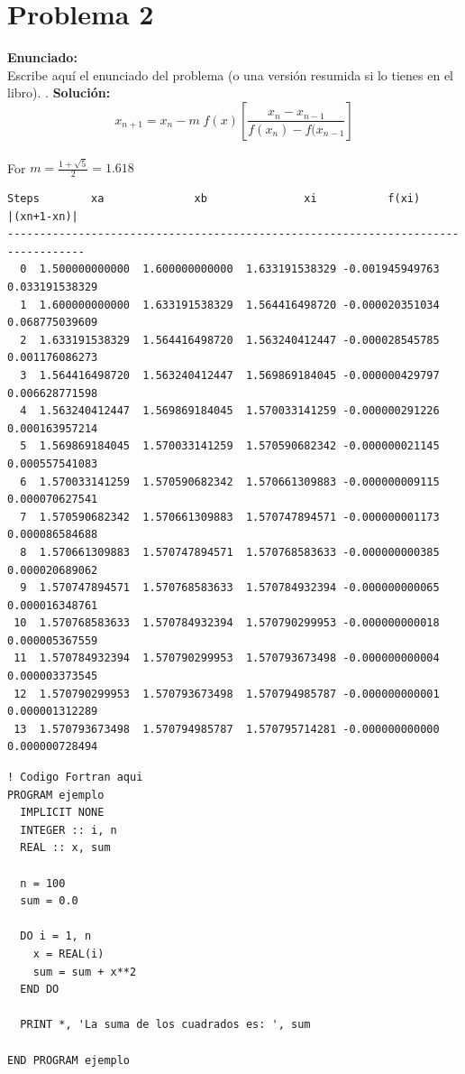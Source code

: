 \documentclass[10pt,a4paper]{article}
\begin{document}
\section*{Problema 2}
\textbf{Enunciado:} \\
Escribe aquí el enunciado del problema (o una versión resumida si lo tienes en el libro). \cite{Ding_and_Williams}.\cite{Yang_Kurth_Willians}
\textbf{Solución:} \\
\begin{equation}
  x_{n+1}  =  x_n - m\;f(x)\left[\frac{x_n-x_{n-1}}{f(x_n)-f(x_{n-1}}\right]
\end{equation}
\hspace{1mm}\\
For $m=\frac{1+\sqrt{5}}{2}=1.618$\\
\begin{verbatim}
Steps        xa              xb               xi           f(xi)       |(xn+1-xn)|
----------------------------------------------------------------------------------
  0  1.500000000000  1.600000000000  1.633191538329 -0.001945949763  0.033191538329 
  1  1.600000000000  1.633191538329  1.564416498720 -0.000020351034  0.068775039609 
  2  1.633191538329  1.564416498720  1.563240412447 -0.000028545785  0.001176086273 
  3  1.564416498720  1.563240412447  1.569869184045 -0.000000429797  0.006628771598 
  4  1.563240412447  1.569869184045  1.570033141259 -0.000000291226  0.000163957214 
  5  1.569869184045  1.570033141259  1.570590682342 -0.000000021145  0.000557541083 
  6  1.570033141259  1.570590682342  1.570661309883 -0.000000009115  0.000070627541 
  7  1.570590682342  1.570661309883  1.570747894571 -0.000000001173  0.000086584688 
  8  1.570661309883  1.570747894571  1.570768583633 -0.000000000385  0.000020689062 
  9  1.570747894571  1.570768583633  1.570784932394 -0.000000000065  0.000016348761 
 10  1.570768583633  1.570784932394  1.570790299953 -0.000000000018  0.000005367559 
 11  1.570784932394  1.570790299953  1.570793673498 -0.000000000004  0.000003373545 
 12  1.570790299953  1.570793673498  1.570794985787 -0.000000000001  0.000001312289 
 13  1.570793673498  1.570794985787  1.570795714281 -0.000000000000  0.000000728494 
\end{verbatim}
\begin{lstlisting}
! Codigo Fortran aqui
PROGRAM ejemplo
  IMPLICIT NONE
  INTEGER :: i, n
  REAL :: x, sum

  n = 100
  sum = 0.0

  DO i = 1, n
    x = REAL(i)
    sum = sum + x**2
  END DO

  PRINT *, 'La suma de los cuadrados es: ', sum

END PROGRAM ejemplo
\end{lstlisting}
\end{document}
